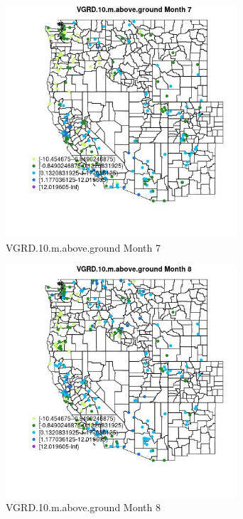 \begin{figure} 
\centering  
\includegraphics[width=0.77\textwidth]{Code_Outputs/Report_ML_input_PM25_Step4_part_e_de_duplicated_aveswNAs_MapObsMo7VGRD10maboveground.jpg} 
\caption{\label{fig:Report_ML_input_PM25_Step4_part_e_de_duplicated_aveswNAsMapObsMo7VGRD10maboveground}VGRD.10.m.above.ground Month 7} 
\end{figure} 
 

\clearpage 

\begin{figure} 
\centering  
\includegraphics[width=0.77\textwidth]{Code_Outputs/Report_ML_input_PM25_Step4_part_e_de_duplicated_aveswNAs_MapObsMo8VGRD10maboveground.jpg} 
\caption{\label{fig:Report_ML_input_PM25_Step4_part_e_de_duplicated_aveswNAsMapObsMo8VGRD10maboveground}VGRD.10.m.above.ground Month 8} 
\end{figure} 
 


